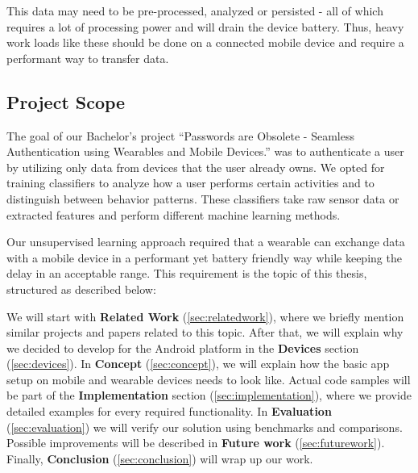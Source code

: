 This data may need to be pre-processed, analyzed or persisted - all of which requires a lot of processing power and will drain the device battery.
Thus, heavy work loads like these should be done on a connected mobile device and require a performant way to transfer data.

\subsection{Project Scope}
\label{sec:intro:scope}
The goal of our Bachelor's project ``Passwords are Obsolete - Seamless Authentication using Wearables and Mobile Devices.'' was to authenticate a user by utilizing only data from devices that the user already owns.
We opted for training classifiers to analyze how a user performs certain activities and to distinguish between behavior patterns. These classifiers take raw sensor data or extracted features and perform different machine learning methods.

Our unsupervised learning approach required that a wearable can exchange data with a mobile device in a performant yet battery friendly way while keeping the delay in an acceptable range.
This requirement is the topic of this thesis, structured as described below:

We will start with \textbf{Related Work} (\ref{sec:relatedwork}), where we briefly mention similar projects and papers related to this topic.
After that, we will explain why we decided to develop for the Android platform in the \textbf{Devices} section (\ref{sec:devices}).
In \textbf{Concept} (\ref{sec:concept}), we will explain how the basic app setup on mobile and wearable devices needs to look like.
Actual code samples will be part of the \textbf{Implementation} section (\ref{sec:implementation}), where we provide detailed examples for every required functionality.
In \textbf{Evaluation} (\ref{sec:evaluation}) we will verify our solution using benchmarks and comparisons.
Possible improvements will be described in \textbf{Future work} (\ref{sec:futurework}).
Finally, \textbf{Conclusion} (\ref{sec:conclusion}) will wrap up our work.


\clearpage